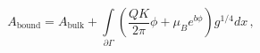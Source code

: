 \begin{equation}
A_{\mathrm{bound}}=A_{\mathrm{bulk}}+\int\limits_{\partial\Gamma}\left(
\frac{QK}{2\pi}\phi+\mu_{B}e^{b\phi}\right)
g^{1/4}dx \, ,\label{gbound} \nonumber
\end{equation}

